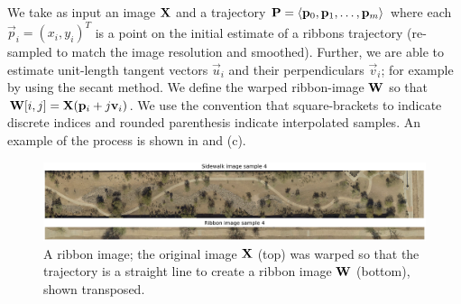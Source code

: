 We take as input an image $\mathbf{X}{}$ and a trajectory $\mathbf{P}{}=\langle \mathbf{p}_0, \mathbf{p}_1,\dots,\mathbf{p}_m\rangle$ where each $\vec{p}_i=(x_i, y_i)^T$ is a point on the initial estimate of a ribbons trajectory (re-sampled to match the image resolution and smoothed). Further, we are able to estimate unit-length tangent vectors $\vec{u}_i$ and their perpendiculars $\vec{v}_i$; for example by using the secant method. 
We define the warped ribbon-image $\mathbf{W}{}$ so that $\mathbf{W}{[i,j]}=\mathbf{X}{}(\mathbf{p}_i+ j \mathbf{v}_i)$. We use the convention that square-brackets to indicate discrete indices and rounded parenthesis indicate interpolated samples.  An example of the process is shown in  and (c). 


\begin{figure}[ht]
    \centering
    \includegraphics[width=0.95\columnwidth]{Figures/Sample4_needed.png}
    \caption[Sample Sidewalk]{A ribbon image; the original image $\mathbf{X}{}$ (top) was warped so that the trajectory is a straight line to create a ribbon image $\mathbf{W}{}$ (bottom), shown transposed.}
    \label{fig:Sample_Sidewalk_4}
\end{figure}

